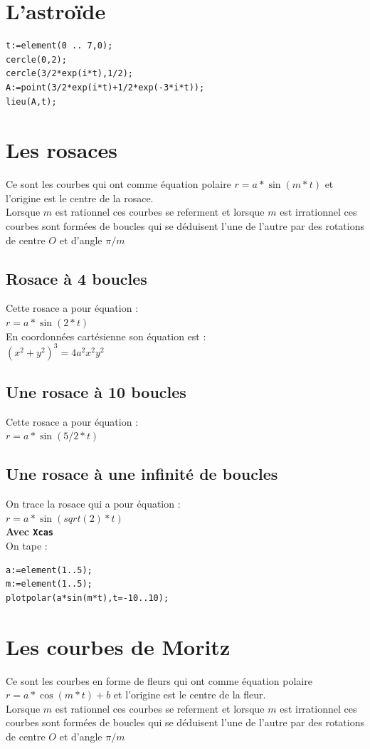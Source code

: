 \documentclass[a4paper,11pt]{book}
\begin{document}
\section{L'astro\"ide}
\begin{verbatim}
t:=element(0 .. 7,0);
cercle(0,2);
cercle(3/2*exp(i*t),1/2);
A:=point(3/2*exp(i*t)+1/2*exp(-3*i*t));
lieu(A,t);
\end{verbatim}

\section{Les rosaces}
Ce sont les courbes qui ont comme \'equation polaire $r=a*\sin(m*t)$ et 
l'origine est le centre de la rosace.\\
Lorsque $m$ est rationnel ces courbes se referment et lorsque $m$ est 
irrationnel ces courbes sont form\'ees de boucles qui se d\'eduisent l'une de l'autre par des rotations de centre $O$ et d'angle $\pi/m$ 

\subsection{Rosace \`a 4 boucles}
Cette rosace a pour \'equation :\\
$r=a*\sin(2*t)$\\
En coordonn\'ees cart\'esienne son \'equation est :\\
$(x^2+y^2)^3=4a^2x^2y^2$
\subsection{Une rosace \`a 10 boucles}
Cette rosace a pour \'equation :\\
$r=a*\sin(5/2*t)$\\
\subsection{Une rosace \`a une infinit\'e de  boucles}
On trace la rosace qui a pour \'equation :\\
$r=a*\sin(sqrt(2)*t)$\\
{\bf Avec {\tt Xcas}}\\
On tape :\\
\begin{verbatim}
a:=element(1..5);
m:=element(1..5);
plotpolar(a*sin(m*t),t=-10..10);
\end{verbatim}
\section{Les courbes de Moritz}
Ce sont les courbes en forme de fleurs qui ont comme \'equation polaire 
$r=a*\cos(m*t)+b$ et 
l'origine est le centre de la fleur.\\
Lorsque $m$ est rationnel ces courbes se referment et lorsque $m$ est 
irrationnel ces courbes sont form\'ees de boucles qui se d\'eduisent l'une de l'autre par des rotations de centre $O$ et d'angle $\pi/m$ 
\end{document}
